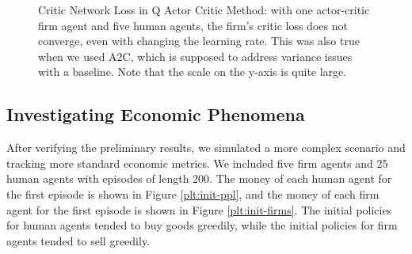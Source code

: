 \documentclass[twoside,twocolumn]{article}
\begin{document}
\begin{figure}[h]
\caption{Critic Network Loss in Q Actor Critic Method: with one actor-critic firm agent and five human agents, the firm's critic loss does not converge, even with changing the learning rate. This was also true when we used A2C, which is supposed to address variance issues with a baseline. Note that the scale on the y-axis is quite large.}
\label{plt:acadvloss}
\end{figure}




\subsection{Investigating Economic Phenomena}

After verifying the preliminary results, we simulated a more complex scenario and tracking more standard economic metrics. We included five firm agents and 25 human agents with episodes of length 200. The money of each human agent for the first episode is shown in Figure \ref{plt:init-ppl}, and the money of each firm agent for the first episode is shown in Figure \ref{plt:init-firms}. The initial policies for human agents tended to buy goods greedily, while the initial policies for firm agents tended to sell greedily.
\end{document}
